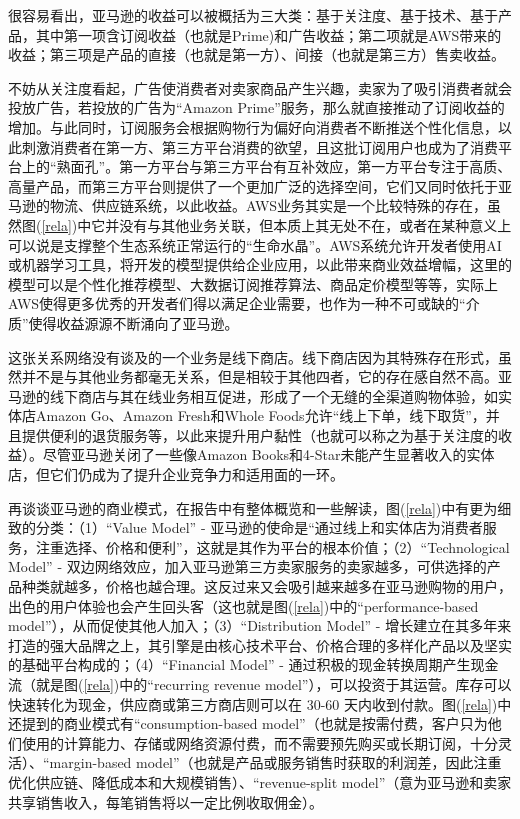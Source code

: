 \documentclass[12pt]{ctexart}
\begin{document}
很容易看出，亚马逊的收益可以被概括为三大类：基于关注度、基于技术、基于产品，其中第一项含订阅收益（也就是Prime)和广告收益；第二项就是AWS带来的收益；第三项是产品的直接（也就是第一方）、间接（也就是第三方）售卖收益。

不妨从关注度看起，广告使消费者对卖家商品产生兴趣，卖家为了吸引消费者就会投放广告，若投放的广告为“Amazon Prime”服务，那么就直接推动了订阅收益的增加。与此同时，订阅服务会根据购物行为偏好向消费者不断推送个性化信息，以此刺激消费者在第一方、第三方平台消费的欲望，且这批订阅用户也成为了消费平台上的“熟面孔”。第一方平台与第三方平台有互补效应，第一方平台专注于高质、高量产品，而第三方平台则提供了一个更加广泛的选择空间，它们又同时依托于亚马逊的物流、供应链系统，以此收益。AWS业务其实是一个比较特殊的存在，虽然图(\ref{rela})中它并没有与其他业务关联，但本质上其无处不在，或者在某种意义上可以说是支撑整个生态系统正常运行的“生命水晶”。AWS系统允许开发者使用AI或机器学习工具，将开发的模型提供给企业应用，以此带来商业效益增幅，这里的模型可以是个性化推荐模型、大数据订阅推荐算法、商品定价模型等等，实际上AWS使得更多优秀的开发者们得以满足企业需要，也作为一种不可或缺的“介质”使得收益源源不断涌向了亚马逊。

这张关系网络没有谈及的一个业务是线下商店。线下商店因为其特殊存在形式，虽然并不是与其他业务都毫无关系，但是相较于其他四者，它的存在感自然不高。亚马逊的线下商店与其在线业务相互促进，形成了一个无缝的全渠道购物体验，如实体店Amazon Go、Amazon Fresh和Whole Foods允许“线上下单，线下取货”，并且提供便利的退货服务等，以此来提升用户黏性（也就可以称之为基于关注度的收益）。尽管亚马逊关闭了一些像Amazon Books和4-Star未能产生显著收入的实体店，但它们仍成为了提升企业竞争力和适用面的一环\cite{26}。

再谈谈亚马逊的商业模式，在报告\cite{32}中有整体概览和一些解读，图(\ref{rela})中有更为细致的分类：（1）“Value Model” - 亚马逊的使命是“通过线上和实体店为消费者服务，注重选择、价格和便利”，这就是其作为平台的根本价值；（2）“Technological Model” - 双边网络效应，加入亚马逊第三方卖家服务的卖家越多，可供选择的产品种类就越多，价格也越合理。这反过来又会吸引越来越多在亚马逊购物的用户，出色的用户体验也会产生回头客（这也就是图(\ref{rela})中的“performance-based model”），从而促使其他人加入；（3）“Distribution Model” - 增长建立在其多年来打造的强大品牌之上，其引擎是由核心技术平台、价格合理的多样化产品以及坚实的基础平台构成的；（4）“Financial Model” - 通过积极的现金转换周期产生现金流（就是图(\ref{rela})中的“recurring revenue model”），可以投资于其运营。库存可以快速转化为现金，供应商或第三方商店则可以在 30-60 天内收到付款。图(\ref{rela})中还提到的商业模式有“consumption-based model”（也就是按需付费，客户只为他们使用的计算能力、存储或网络资源付费，而不需要预先购买或长期订阅，十分灵活）、“margin-based model”（也就是产品或服务销售时获取的利润差，因此注重优化供应链、降低成本和大规模销售）、“revenue-split model”（意为亚马逊和卖家共享销售收入，每笔销售将以一定比例收取佣金）。
\end{document}
